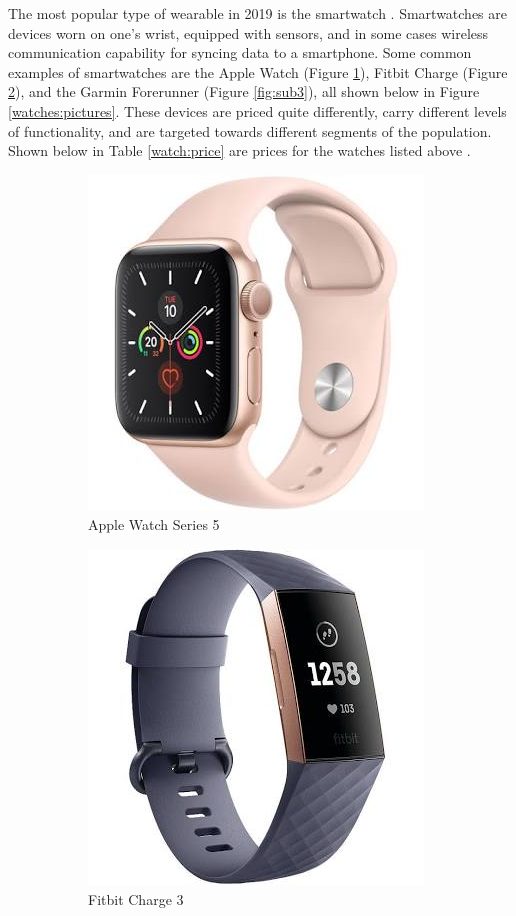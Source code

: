 The most popular type of wearable in 2019 is the smartwatch \cite{best_watches}. 
Smartwatches are devices worn on one's wrist,
equipped with sensors, and in some cases wireless communication capability for syncing data to a smartphone.
Some common examples of smartwatches are the Apple Watch (Figure \ref{fig:sub1}), 
Fitbit Charge (Figure \ref{fig:sub2}), and the Garmin Forerunner (Figure \ref{fig:sub3}),
all shown below in Figure \ref{watches:pictures}.
These devices are priced quite differently, carry different levels of functionality, and are
targeted towards different segments of the population. Shown below in Table \ref{watch:price} are 
prices for the watches listed above \cite{apple_price} \cite{fitbit_price} \cite{garmin_price}.

\begin{figure}[h]
    \centering
    \begin{subfigure}{.5\textwidth}
      \centering
      \includegraphics[width=.4\linewidth]{media/apple_pic.jpeg}
      \caption{Apple Watch Series 5 \cite{apple_price}}
      \label{fig:sub1}
    \end{subfigure}%
    \begin{subfigure}{.5\textwidth}
      \centering
      \includegraphics[width=.4\linewidth]{media/fitbit_pic.jpeg}
      \caption{Fitbit Charge 3 \cite{fitbit_price}}
      \label{fig:sub2}
    \end{subfigure}
    \begin{subfigure}{.5\textwidth}

\end{subfigure}
\end{figure}
